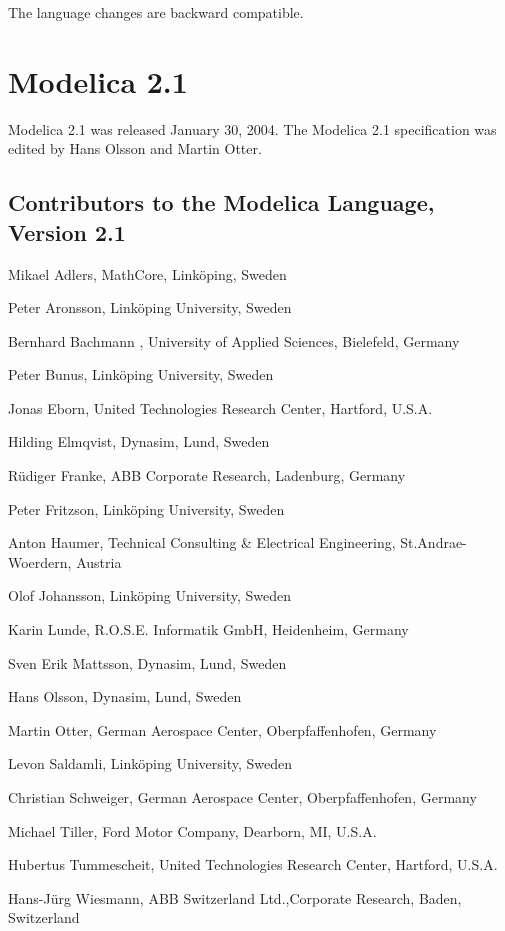 \documentclass[10pt,a4paper]{report}
\def\doublelabel#1{\label{#1}}
\begin{document}
The language changes are backward compatible.

\section{Modelica 2.1}\doublelabel{modelica-2-1}

Modelica 2.1 was released January 30, 2004. The Modelica 2.1
specification was edited by Hans Olsson and Martin Otter.

\subsection{Contributors to the Modelica Language, Version 2.1}\doublelabel{contributors-to-the-modelica-language-version-2-1}
\indent\indent
Mikael Adlers, MathCore, Linköping, Sweden

Peter Aronsson, Linköping University, Sweden

Bernhard Bachmann , University of Applied Sciences, Bielefeld, Germany

Peter Bunus, Linköping University, Sweden

Jonas Eborn, United Technologies Research Center, Hartford, U.S.A.

Hilding Elmqvist, Dynasim, Lund, Sweden

Rüdiger Franke, ABB Corporate Research, Ladenburg, Germany

Peter Fritzson, Linköping University, Sweden

Anton Haumer, Technical Consulting \& Electrical Engineering,
St.Andrae-Woerdern, Austria

Olof Johansson, Linköping University, Sweden

Karin Lunde, R.O.S.E. Informatik GmbH, Heidenheim, Germany

Sven Erik Mattsson, Dynasim, Lund, Sweden

Hans Olsson, Dynasim, Lund, Sweden

Martin Otter, German Aerospace Center, Oberpfaffenhofen, Germany

Levon Saldamli, Linköping University, Sweden

Christian Schweiger, German Aerospace Center, Oberpfaffenhofen, Germany

Michael Tiller, Ford Motor Company, Dearborn, MI, U.S.A.

Hubertus Tummescheit, United Technologies Research Center, Hartford,
U.S.A.

Hans-Jürg Wiesmann, ABB Switzerland Ltd.,Corporate Research, Baden,
Switzerland
\end{document}
